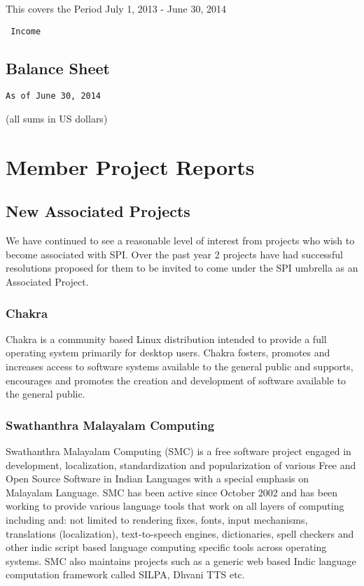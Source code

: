 \documentclass[letterpaper]{report}
\begin{document}
This covers the Period July 1, 2013 - June 30, 2014

\begin{verbatim}
 Income
\end{verbatim}

\section{Balance Sheet}

\begin{verbatim}
As of June 30, 2014
\end{verbatim}

(all sums in US dollars)


\chapter{Member Project Reports}

\section{New Associated Projects}

We have continued to see a reasonable level of interest from projects who wish
to become associated with SPI. Over the past year 2 projects have had
successful resolutions proposed for them to be invited to come under the SPI
umbrella as an Associated Project.


\subsection{Chakra}

Chakra is a community based Linux distribution intended to provide a full
operating system primarily for desktop users.  Chakra fosters, promotes and
increases access to software systems available to the general public and
supports, encourages and promotes the creation and development of software
available to the general public.


\subsection{Swathanthra Malayalam Computing}

Swathanthra Malayalam Computing (SMC) is a free software project engaged
in development, localization, standardization and popularization of
various Free and Open Source Software in Indian Languages with a special
emphasis on Malayalam Language. SMC has been active since October 2002 and
has been working to provide various language tools that work on all layers
of computing including and: not limited to rendering fixes, fonts, input
mechanisms, translations (localization), text-to-speech engines,
dictionaries, spell checkers and other indic script based language
computing specific tools across operating systems. SMC also maintains
projects such as a generic web based Indic language computation framework
called SILPA, Dhvani TTS etc.
\end{document}
